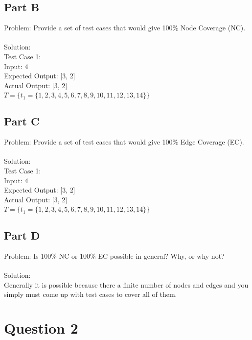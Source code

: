 \documentclass{article}
\begin{document}
\subsection*{Part B}
Problem: Provide a set of test cases that would give 100\% Node Coverage (NC). \\\\
Solution:\\
Test Case 1: \\
Input: 4 \\
Expected Output: [3, 2]\\
Actual Output: [3, 2]\\
$T = \{ t_1 = \{1, 2, 3, 4, 5, 6, 7, 8, 9, 10, 11, 12, 13, 14\}\}$
\subsection*{Part C}
Problem: Provide a set of test cases that would give 100\% Edge Coverage (EC). \\\\
Solution: \\
Test Case 1: \\
Input: 4 \\
Expected Output: [3, 2]\\
Actual Output: [3, 2]\\
$T = \{ t_1 = \{1, 2, 3, 4, 5, 6, 7, 8, 9, 10, 11, 12, 13, 14\}\}$
\subsection*{Part D}
Problem: Is 100\% NC or 100\% EC possible in general? Why, or why not? \\\\
Solution: \\

Generally it is possible because there a finite number of nodes and edges and you simply must come up with test cases to cover all of them.
\newpage

\section*{Question 2}
\end{document}
